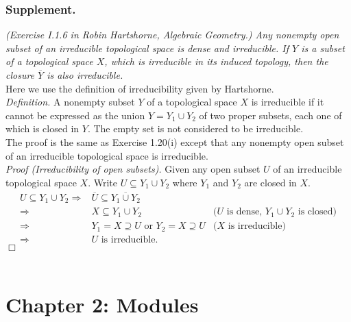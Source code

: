 \documentclass{article}
\begin{document}
\subsubsection*{Supplement.}
\emph{(Exercise I.1.6 in Robin Hartshorne, Algebraic Geometry.)
Any nonempty open subset of an irreducible topological space is dense and irreducible.
If $Y$ is a subset of a topological space $X$, which is irreducible in its induced topology,
then the closure $\overline{Y}$ is also irreducible.} \\

Here we use the definition of irreducibility given by Hartshorne. \\

\emph{Definition.}
A nonempty subset $Y$ of a topological space $X$ is irreducible
if it cannot be expressed as the union $Y = Y_1 \cup Y_2$ of two proper subsets,
each one of which is closed in $Y$. The empty set is not considered to be irreducible. \\

The proof is the same as Exercise 1.20(i) except
that any nonempty open subset of an irreducible topological space is irreducible. \\

\emph{Proof (Irreducibility of open subsets).}
Given any open subset $U$ of an irreducible topological space $X$.
Write $U \subseteq Y_1 \cup Y_2$ where $Y_1$ and $Y_2$ are closed in $X$.
  \begin{align*}
  U \subseteq Y_1 \cup Y_2
  \Longrightarrow&
  \overline{U} \subseteq \overline{Y_1 \cup Y_2} \\
  \Longrightarrow&
  X \subseteq Y_1 \cup Y_2
    &\text{($U$ is dense, $Y_1 \cup Y_2$ is closed)} \\
  \Longrightarrow&
  Y_1 = X \supseteq U \text{ or } Y_2 = X \supseteq U
    &\text{($X$ is irreducible)} \\
  \Longrightarrow&
  \text{$U$ is irreducible.}
  \end{align*}
$\Box$ \\\\






\newpage
\section*{Chapter 2: Modules \\}
\end{document}
